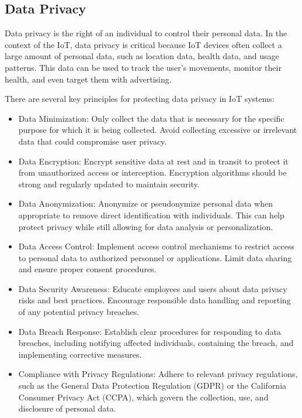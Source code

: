 \documentclass[conference]{IEEEtran}
\begin{document}
\subsection{Data Privacy}

Data privacy is the right of an individual to control their personal data. In the context of the IoT, data privacy is critical because IoT devices often collect a large amount of personal data, such as location data, health data, and usage patterns. This data can be used to track the user's movements, monitor their health, and even target them with advertising.

There are several key principles for protecting data privacy in IoT systems:

\begin{itemize}
    \item Data Minimization: Only collect the data that is necessary for the specific purpose for which it is being collected. Avoid collecting excessive or irrelevant data that could compromise user privacy.
    \item Data Encryption: Encrypt sensitive data at rest and in transit to protect it from unauthorized access or interception. Encryption algorithms should be strong and regularly updated to maintain security.
    \item Data Anonymization: Anonymize or pseudonymize personal data when appropriate to remove direct identification with individuals. This can help protect privacy while still allowing for data analysis or personalization.
    \item Data Access Control: Implement access control mechanisms to restrict access to personal data to authorized personnel or applications. Limit data sharing and ensure proper consent procedures.
    \item Data Security Awareness: Educate employees and users about data privacy risks and best practices. Encourage responsible data handling and reporting of any potential privacy breaches.
    \item Data Breach Response: Establish clear procedures for responding to data breaches, including notifying affected individuals, containing the breach, and implementing corrective measures.
    \item Compliance with Privacy Regulations: Adhere to relevant privacy regulations, such as the General Data Protection Regulation (GDPR) or the California Consumer Privacy Act (CCPA), which govern the collection, use, and disclosure of personal data.
\end{itemize}
\end{document}
